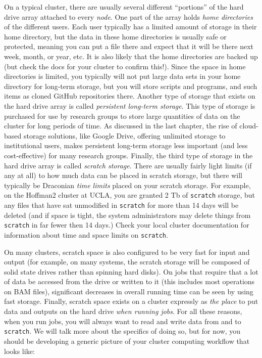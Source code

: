 \documentclass[]{krantz}
\begin{document}
On a typical cluster, there are usually several different ``portions'' of the hard drive
array attached to every \emph{node}. One part of the array holds \emph{home directories} of the
different users. Each user typically has a limited amount of storage in their home directory, but
the data in these home directories is usually safe or protected, meaning you can put a file there
and expect that it will be there next week, month, or year, etc. It is also likely that the home directories are
backed up (but check the docs for your cluster to confirm this!). Since the space in home directories is limited,
you typically will not put large data sets in your home directory for long-term storage, but you will
store scripts and programs, and such items as cloned GitHub repositories there. Another
type of storage that exists on the hard drive array is called \emph{persistent long-term storage}. This type of storage
is purchased for use by research groups to store large quantities of
data on the cluster for long periods of time. As discussed in the last chapter, the rise of cloud-based storage solutions,
like Google Drive, offering unlimited storage to institutional users, makes persistent long-term storage less
important (and less cost-effective) for many research groups. Finally, the third type of
storage in the hard drive array is called \emph{scratch storage}. There are usually fairly
light limits (if any at all) to how much data can be placed in scratch storage, but there
will typically be Draconian \emph{time limits} placed on your scratch storage. For example, on the
Hoffman2 cluster at UCLA, you are granted 2 Tb of \texttt{scratch} storage, but any files that
have sat unmodified in \texttt{scratch} for more than 14 days will be deleted (and if space is tight, the
system administrators may delete things from \texttt{scratch} in far fewer then 14 days.) Check
your local cluster documentation for information about time and space limits on \texttt{scratch}.

On many clusters, scratch space is also configured to be very fast for input and output
(for example, on many systems, the scratch storage will be composed of solid state drives rather
than spinning hard disks). On jobs that require that a lot of data be accessed from the
drive or written to it (this includes most operations on BAM files), significant decreases
in overall running time can be seen by using fast storage. Finally, scratch space exists on a cluster
expressly as \emph{the place} to put data and outputs on the hard drive \emph{when running jobs}. For all these
reasons, when you run jobs, you will always want to read and write data from and to \texttt{scratch}. We
will talk more about the specifics of doing so, but for now, you should be developing a generic picture
of your cluster computing workflow that looks like:
\end{document}
